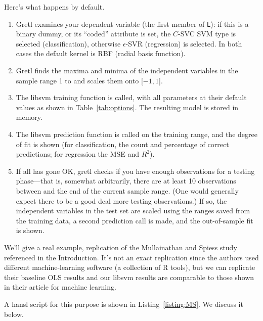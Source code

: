 \documentclass{article}
\begin{document}
Here's what happens by default.
\begin{enumerate}
\item Gretl examines your dependent variable (the first member of
  \texttt{L}): if this is a binary dummy, or its ``coded'' attribute
  is set, the $C$-SVC SVM type is selected (classification), otherwise
  $\epsilon$-SVR (regression) is selected. In both cases the default
  kernel is RBF (radial basis function).
\item Gretl finds the maxima and minima of the independent variables
  in the sample range 1 to  and scales them onto
  [$-1,1$].
\item The \textsf{libsvm} training function is called, with all
  parameters at their default values as shown in
  Table~\ref{tab:options}. The resulting model is stored in memory.
\item The \textsf{libsvm} prediction function is called on the
  training range, and the degree of fit is shown (for classification,
  the count and percentage of correct predictions; for regression the
  MSE and $R^2$).
\item If all has gone OK, gretl checks if you have enough observations
  for a testing phase---that is, somewhat arbitrarily, there are at
  least 10 observations between  and the end of the
  current sample range. (One would generally expect there to be a good
  deal more testing observations.) If so, the independent variables in
  the test set are scaled using the ranges saved from the training
  data, a second prediction call is made, and the out-of-sample fit is
  shown.
\end{enumerate}

We'll give a real example, replication of the Mullainathan and Spiess
study referenced in the Introduction. It's not an exact replication
since the authors used different machine-learning software (a
collection of \textsf{R} tools), but we can replicate their baseline
OLS results and our \textsf{libsvm} results are comparable to those
shown in their article for machine learning.

A hansl script for this purpose is shown in Listing~\ref{listing:MS}.
We discuss it below.
\end{document}
